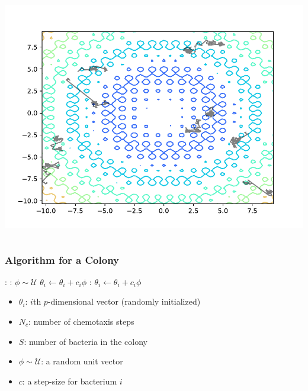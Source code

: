\documentclass{beamer}
\begin{document}
\begin{frame}
\begin{columns}
\includegraphics[scale=0.3]{assets/rastrigin_theta}
\end{columns}
\end{frame}

\begin{frame}
\frametitle{Algorithm for a Colony}
\begin{algorithmic}[1]
:
  :
    \State $\phi \sim \mathcal{U}$
    \State $\theta_i \gets \theta_i + c_i \phi$
    :
      \State $\theta_i \gets \theta_i + c_i \phi$
    \EndWhile
  \EndFor
\EndFor
\end{algorithmic}
\begin{itemize}
  \item $\theta_i$: $i$th $p$-dimensional vector (randomly initialized)
  \item $N_c$: number of chemotaxis steps
  \item $S$: number of bacteria in the colony
  \item $\phi \sim \mathcal{U}$: a random unit vector
  \item $c$: a step-size for bacterium $i$
\end{itemize}
\end{frame}
\end{document}
